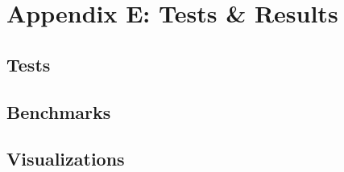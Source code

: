 \section{Appendix E: Tests \& Results}

 \subsection{Tests}
 
 \subsection{Benchmarks}
 
 \subsection{Visualizations}
 
 